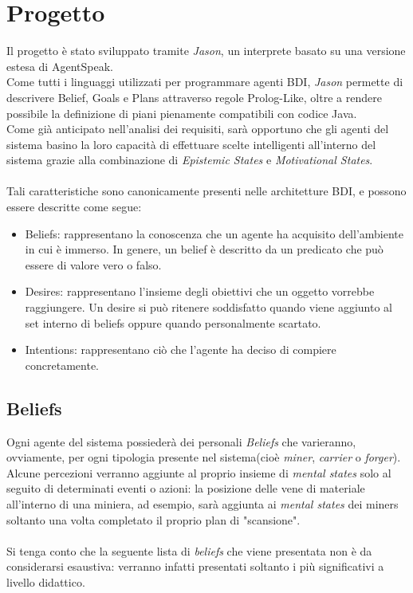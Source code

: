 \documentclass{llncs}
\newcommand{\labelsec}[1]{\label{sec:#1}}
\begin{document}
\section{Progetto}
\labelsec{Progetto}
Il progetto è stato sviluppato tramite \textit{Jason}, un interprete basato su una versione estesa di AgentSpeak.\\
Come tutti i linguaggi utilizzati per programmare agenti BDI, \textit{Jason} permette di descrivere Belief, Goals e Plans attraverso regole Prolog-Like, oltre a rendere possibile la definizione di piani pienamente compatibili con codice Java.\\
Come già anticipato nell'analisi dei requisiti, sarà opportuno che gli agenti del sistema basino la loro capacità di effettuare scelte intelligenti all'interno del sistema grazie alla combinazione di \textit{Epistemic States} e \textit{Motivational States}.\\\\
Tali caratteristiche sono canonicamente presenti nelle architetture BDI, e possono essere descritte come segue:
\begin{itemize}
	\item Beliefs: rappresentano la conoscenza che un agente ha acquisito dell'ambiente in cui è immerso. In genere, un belief è descritto da un predicato che può essere di valore vero o falso.\\
	\item Desires: rappresentano l'insieme degli obiettivi che un oggetto vorrebbe raggiungere. Un desire si può ritenere soddisfatto quando viene aggiunto al set interno di beliefs oppure quando personalmente scartato.\\
	\item Intentions: rappresentano ciò che l'agente ha deciso di compiere concretamente.
\end{itemize}
\newpage
\subsection{Beliefs}
Ogni agente del sistema possiederà dei personali \textit{Beliefs} che varieranno, ovviamente, per ogni tipologia presente nel sistema(cioè \textit{miner}, \textit{carrier} o \textit{forger}).\\Alcune percezioni verranno aggiunte al proprio insieme di \textit{mental states} solo al seguito di determinati eventi o azioni: la posizione delle vene di materiale all'interno di una miniera, ad esempio, sarà aggiunta ai \textit{mental states} dei miners soltanto una volta completato il proprio plan di "scansione".\\\\
Si tenga conto che la seguente lista di \textit{beliefs} che viene presentata non è da considerarsi esaustiva: verranno infatti presentati soltanto i più significativi a livello didattico.
\end{document}
